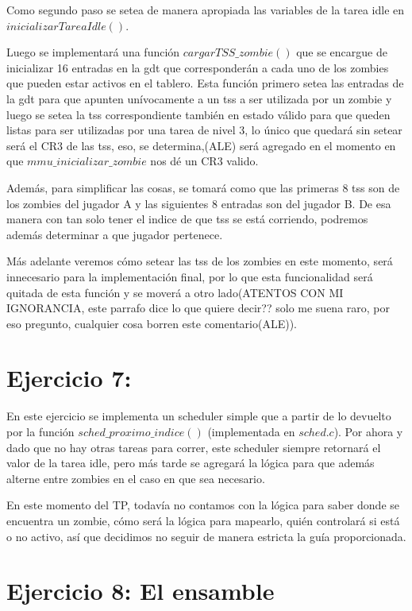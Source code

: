 \documentclass[a4paper]{article}
\begin{document}
Como segundo paso se setea de manera apropiada las variables de la tarea idle en $inicializarTareaIdle()$.

Luego se implementará una función $cargarTSS\_ zombie()$ que se encargue de inicializar 16 entradas en la gdt que corresponderán a cada uno de los zombies que pueden estar activos en el tablero. Esta función primero setea las entradas de la gdt para que apunten unívocamente a un tss a ser utilizada por un zombie y luego se setea la tss correspondiente también en estado válido para que queden listas para ser utilizadas por una tarea de nivel 3, lo único que quedará sin setear será el CR3 de las tss, eso, se determina,(ALE) será agregado en el momento en que $mmu\_ inicializar\_ zombie$ nos dé un CR3 valido.

Además, para simplificar las cosas, se tomará como que las primeras 8 tss son de los zombies del jugador A y las siguientes 8 entradas son del jugador B. De esa manera con tan solo tener el indice de que tss se está corriendo, podremos además determinar a que jugador pertenece.

Más adelante veremos cómo setear las tss de los zombies en este momento, será innecesario para la implementación final, por lo que esta funcionalidad será quitada de esta función y se moverá a otro lado(ATENTOS CON MI IGNORANCIA, este parrafo dice lo que quiere decir?? solo me suena raro, por eso pregunto, cualquier cosa borren este comentario(ALE)).

\section{Ejercicio 7:}

En este ejercicio se implementa un scheduler simple que a partir de lo devuelto por la función $sched\_ proximo\_ indice()$ (implementada en $sched.c$). Por ahora y dado que no hay otras tareas para correr, este scheduler siempre retornará el valor de la tarea idle, pero más tarde se agregará la lógica para que además alterne entre zombies en el caso en que sea necesario.

En este momento del TP, todavía no contamos con la lógica para saber donde se encuentra un zombie, cómo será la lógica para mapearlo, quién controlará si está o no activo, así que decidimos no seguir de manera estricta la guía proporcionada.

\section{Ejercicio 8: El ensamble}
\end{document}
